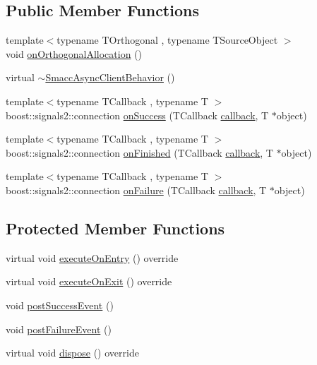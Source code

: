 \subsection*{Public Member Functions}
\begin{DoxyCompactItemize}
\item 
{\footnotesize template$<$typename T\+Orthogonal , typename T\+Source\+Object $>$ }\\void \hyperlink{classsmacc_1_1SmaccAsyncClientBehavior_a85bf707ed4fc349e0e35d89c9e78bc54}{on\+Orthogonal\+Allocation} ()
\item 
virtual \hyperlink{classsmacc_1_1SmaccAsyncClientBehavior_a0028345c409db6fdead7a16b23b9f0aa}{$\sim$\+Smacc\+Async\+Client\+Behavior} ()
\item 
{\footnotesize template$<$typename T\+Callback , typename T $>$ }\\boost\+::signals2\+::connection \hyperlink{classsmacc_1_1SmaccAsyncClientBehavior_a48d8a07e7fc65220f1eeee49af02a82a}{on\+Success} (T\+Callback \hyperlink{sm__ridgeback__barrel__search__2_2servers_2opencv__perception__node_2opencv__perception__node_8cpp_a050e697bd654facce10ea3f6549669b3}{callback}, T $\ast$object)
\item 
{\footnotesize template$<$typename T\+Callback , typename T $>$ }\\boost\+::signals2\+::connection \hyperlink{classsmacc_1_1SmaccAsyncClientBehavior_aae9e2dd0d8e3ff25503f0908f040a221}{on\+Finished} (T\+Callback \hyperlink{sm__ridgeback__barrel__search__2_2servers_2opencv__perception__node_2opencv__perception__node_8cpp_a050e697bd654facce10ea3f6549669b3}{callback}, T $\ast$object)
\item 
{\footnotesize template$<$typename T\+Callback , typename T $>$ }\\boost\+::signals2\+::connection \hyperlink{classsmacc_1_1SmaccAsyncClientBehavior_a34d7ba8f590393e4cd7d2f742f04189a}{on\+Failure} (T\+Callback \hyperlink{sm__ridgeback__barrel__search__2_2servers_2opencv__perception__node_2opencv__perception__node_8cpp_a050e697bd654facce10ea3f6549669b3}{callback}, T $\ast$object)
\end{DoxyCompactItemize}
\subsection*{Protected Member Functions}
\begin{DoxyCompactItemize}
\item 
virtual void \hyperlink{classsmacc_1_1SmaccAsyncClientBehavior_ab8ca63d40d61554263466fe4c0b5cbd1}{execute\+On\+Entry} () override
\item 
virtual void \hyperlink{classsmacc_1_1SmaccAsyncClientBehavior_a3d982d370df4f133ad37c0b2370e9b82}{execute\+On\+Exit} () override
\item 
void \hyperlink{classsmacc_1_1SmaccAsyncClientBehavior_adf18efe1f0e4eacc1277b8865a8a94b1}{post\+Success\+Event} ()
\item 
void \hyperlink{classsmacc_1_1SmaccAsyncClientBehavior_af6fa358cb1ab5ed16791a201f59260e0}{post\+Failure\+Event} ()
\item 
virtual void \hyperlink{classsmacc_1_1SmaccAsyncClientBehavior_af475cee853947a8d3f513c7fb9789e7a}{dispose} () override
\end{DoxyCompactItemize}

